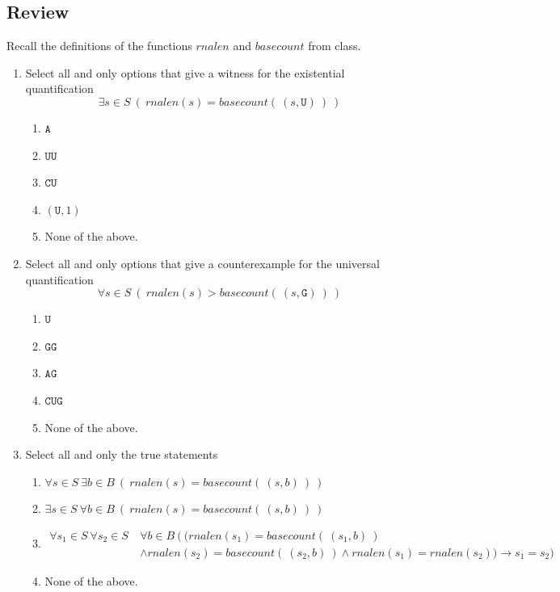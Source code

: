 \documentclass[12pt, oneside]{article}
\newcommand{\A}[0]{\texttt{A}}
\newcommand{\C}[0]{\texttt{C}}
\newcommand{\G}[0]{\texttt{G}}
\newcommand{\U}[0]{\texttt{U}}
\begin{document}
\subsection*{Review}


Recall the definitions of the functions $rnalen$ and $basecount$ from class.

\begin{enumerate}
    \item Select all and only options that give a witness for the existential quantification
    $$\exists s \in S ~(~rnalen(s) = basecount(~(s,\U)~)~)$$
    \begin{enumerate}
    \item $\A$
    \item $\U\U$
    \item $\C\U$
    \item $(\U, 1)$
    \item None of the above.
    \end{enumerate}
    
    \item Select all and only options that give a counterexample for the universal quantification
    $$\forall s \in S ~(~rnalen(s) > basecount(~(s,\G)~)~)$$
    \begin{enumerate}
    \item $\U$
    \item $\G\G$
    \item $\A\G$
    \item $\C\U\G$
    \item None of the above.
    \end{enumerate}
    
    \item Select all and only the true statements
    \begin{enumerate}
    \item $\forall s \in S ~\exists b \in B ~\left(~rnalen(s) = basecount(~(s,b)~)~ \right)$
    \item $\exists s \in S ~\forall b \in B ~\left(~rnalen(s) = basecount(~(s,b)~)~ \right)$
    \item \begin{align*} \forall s_1 \in S~\forall s_2 \in S ~&\forall b \in B ~\big( ~\big( rnalen(s_1) = basecount(~(s_1,b)~) \\
    &\land rnalen(s_2) = basecount(~(s_2,b)~) \land rnalen(s_1) = rnalen(s_2) \big) \to s_1 = s_2  \big)\end{align*}
    \item None of the above.
    \end{enumerate}
    
\end{enumerate} 
\newpage
\end{document}
